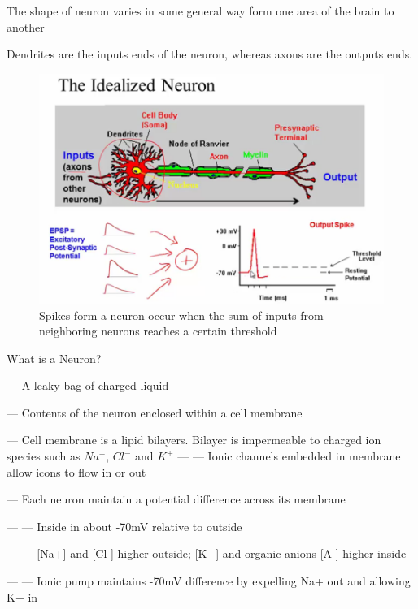 \documentclass{book}
\begin{document}
The shape of neuron varies in some general way form one area of the brain to another

Dendrites are the inputs ends of the neuron, whereas axons are the outputs ends.

\begin{figure}[h]
\centering
\includegraphics[width=0.7\linewidth]{./figures/neuron}
\caption{Spikes form a neuron occur when the sum of inputs from neighboring neurons reaches a certain threshold}
\label{fig:neuron}
\end{figure}

What is a Neuron?

--- A leaky bag of charged liquid

--- Contents of the neuron enclosed within a cell membrane

--- Cell membrane is a lipid bilayers. Bilayer is impermeable to charged ion species such as $Na^+$, $Cl^-$ and $K^+$
--- --- Ionic channels embedded in membrane allow icons to flow in or out

--- Each neuron maintain a potential difference across its membrane

--- --- Inside in about -70mV relative to outside

--- --- [Na+] and [Cl-] higher outside; [K+] and organic anions [A-] higher inside

--- --- Ionic pump maintains -70mV difference by expelling Na+ out and allowing K+ in
\end{document}
